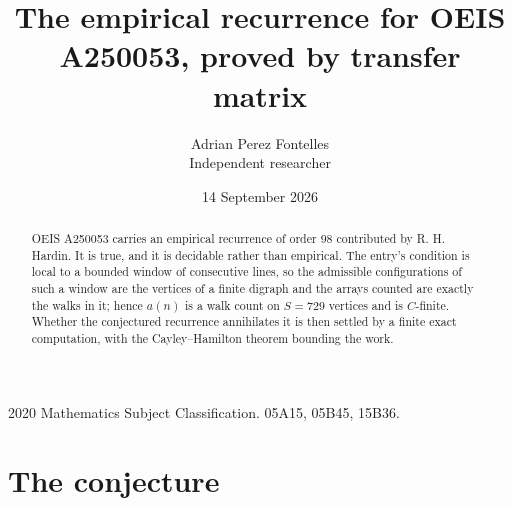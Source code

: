 \documentclass[11pt,a4paper]{article}
\title{The empirical recurrence for OEIS A250053, proved by transfer matrix}
\author{Adrian Perez Fontelles\\ \small Independent researcher}
\date{14 September 2026}
\theoremstyle{plain}
\theoremstyle{definition}
\begin{document}
\maketitle

\begin{abstract}
OEIS A250053 carries an empirical recurrence of order $98$ contributed by R. H. Hardin. It is
true, and it is decidable rather than empirical. The entry's condition is local to a bounded window of consecutive lines, so
the admissible configurations of such a window are the vertices of a finite digraph and the
arrays counted are exactly the walks in it; hence $a(n)$ is a walk count on $S=729$ vertices
and is $C$-finite. Whether the conjectured recurrence annihilates it is then settled by a
finite exact computation, with the Cayley--Hamilton theorem bounding the work.
\end{abstract}

\noindent\small 2020 Mathematics Subject Classification. 05A15, 05B45, 15B36.\normalsize

\section{The conjecture}
\end{document}
